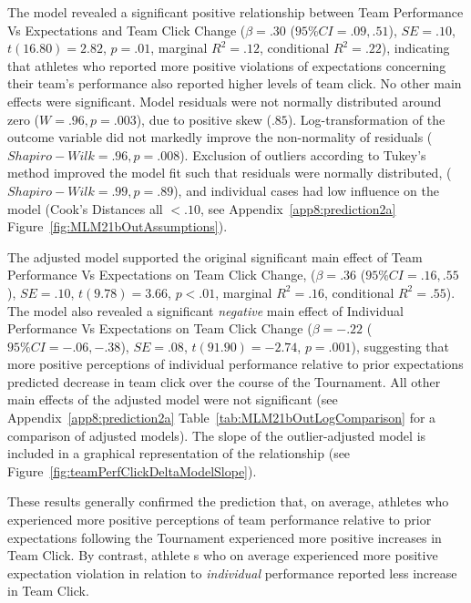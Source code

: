 \begin{CJK}{UTF8}{gbsn}
The model revealed a significant positive relationship between Team Performance Vs Expectations and Team Click Change ($\beta = .30$ ($95\% CI =  .09, .51$), $SE = .10$, $t(16.80) = 2.82$, $p = .01$, marginal $R^2 = .12$, conditional $R^2 = .22$), indicating that athletes who reported more positive violations of expectations concerning their team's performance also reported higher levels of team click.  No other main effects were significant.  Model residuals were not normally distributed around zero ($W = .96, p = .003$), due to positive skew ($.85$).  Log-transformation of the outcome variable did not markedly improve the non-normality of residuals ($Shapiro-Wilk = .96, p = .008$). Exclusion of outliers according to Tukey's method improved the model fit such that residuals were normally distributed, ($Shapiro-Wilk = .99, p = .89$), and individual cases had low influence on the model (Cook's Distances all $< .10$, see Appendix~\ref{app8:prediction2a} Figure~\ref{fig:MLM21bOutAssumptions}).



The adjusted model supported the original significant main effect of Team Performance Vs Expectations on Team Click Change, ($\beta = .36$ ($95\% CI =  .16, .55$), $SE = .10$, $t(9.78) = 3.66$, $p < .01$, marginal $R^2 = .16$, conditional $R^2 = .55$). The model also revealed a significant \textit{negative} main effect of Individual Performance Vs Expectations on Team Click Change ($\beta = -.22$ ($95\% CI =  -.06, -.38$), $SE = .08$, $t(91.90) = -2.74$, $p = .001$), suggesting that more positive perceptions of individual performance relative to prior expectations predicted decrease in team click over the course of the Tournament.
All other main effects of the adjusted model were not significant (see Appendix~\ref{app8:prediction2a} Table~\ref{tab:MLM21bOutLogComparison} for a comparison of adjusted models).  The slope of the outlier-adjusted model is included in a graphical representation of the relationship (see Figure~\ref{fig:teamPerfClickDeltaModelSlope}).

These results generally confirmed the prediction that, on average, athletes who experienced more positive perceptions of team performance relative to prior expectations following the Tournament experienced more positive increases in Team Click.  By contrast, athlete s who on average experienced more positive expectation violation in relation to \textit{individual} performance reported less increase in Team Click.



\end{CJK}
